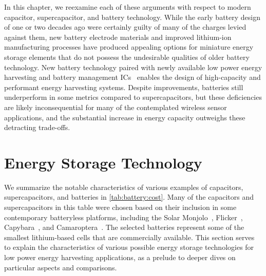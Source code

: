 In this chapter, we reexamine each of these arguments with respect to modern capacitor, supercapacitor, and battery technology. 
While the early battery design of one or two decades ago were certainly guilty of many of the charges levied against them, new 
battery electrode materials and improved lithium-ion manufacturing processes have produced appealing options for miniature energy storage elements
that do not possess the undesirable qualities of older battery technology. 
New battery technology paired with newly available low power energy harvesting and battery management ICs~\cite{bq25505,adp5091} enables the design of high-capacity and performant energy harvesting systems.
Despite improvements, batteries still underperform in some metrics compared to supercapacitors, but these deficiencies are likely inconsequential for many of the contemplated wireless sensor applications, and the substantial increase in energy capacity outweighs these detracting trade-offs.\\

\begin{landscape}
\end{landscape}

\section{Energy Storage Technology}
\label{sec:battery-new}

We summarize the notable characteristics of various examples of capacitors, supercapacitors, and batteries in \cref{tab:battery:cost}. Many of the capacitors and supercapacitors in this table were chosen based on their inclusion in some contemporary batteryless platforms, including the Solar Monjolo~\cite{campbellEnergy14}, Flicker~\cite{hesterFlicker17}, Capybara~\cite{colinReconfigurable18}, and Camaroptera~\cite{nardello2019camaroptera}.
The selected batteries represent some of the smallest lithium-based cells that are commercially available. 
This section serves to explain the characteristics of various possible energy storage technologies for low power energy harvesting applications, as a prelude to deeper dives on particular aspects and comparisons.

